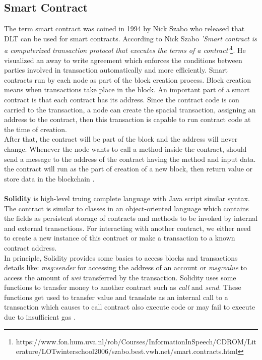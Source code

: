 \subsection{Smart Contract}
 The term smart contract was coined in 1994 by Nick Szabo \cite{Szabo} who released that DLT can be used for smart contracts. 
According to Nick Szabo \textit{'Smart contract is a computerized transaction protocol that executes the terms of a contract'}\footnote{https://www.fon.hum.uva.nl/rob/Courses/InformationInSpeech/CDROM/Literature/LOTwinterschool2006/szabo.best.vwh.net/smart.contracts.html}. He visualized an away to write agreement which enforces the conditions between parties involved in transaction automatically and more efficiently.
Smart contracts run by each node as part of the block creation process. Block creation means when transactions take place in the block.
An important part of a smart contract is that each contract has its address. Since the contract code is con carried to the transaction, a node can create the spacial transaction, assigning an address to the contract, then this transaction is capable to run contract code at the time of creation.\\
After that, the contract will be part of the block and the address will never change. Whenever the node wants to call a method inside the contract, should send a message to the address of the contract having the method and input data.
the contract will run as the part of creation of a new block, then return value or store data in the blockchain \cite{Payrott}.\\
\\
\textbf{Solidity} is high-level truing complete language with Java script similar syntax. The contract is similar to classes in an object-oriented language which contains the fields as persistent storage of contracts and methods to be invoked by internal and external transactions. For interacting with another contract, we either need to create a new instance of this contract or make a transaction to a known contract address.\\
In principle, Solidity provides some basics to access blocks and transactions details like: \textit{msg:sender} for accessing the address of an account or \textit{msg:value} to access the amount of \textit{wei} transferred by the transaction. Solidity uses some functions to transfer money to another contract such as \textit{call} and \textit{send}. These functions get used to transfer value and translate as an internal call to a transaction which causes to call contract also execute code or may fail to execute due to insufficient gas \cite{Ilya}.